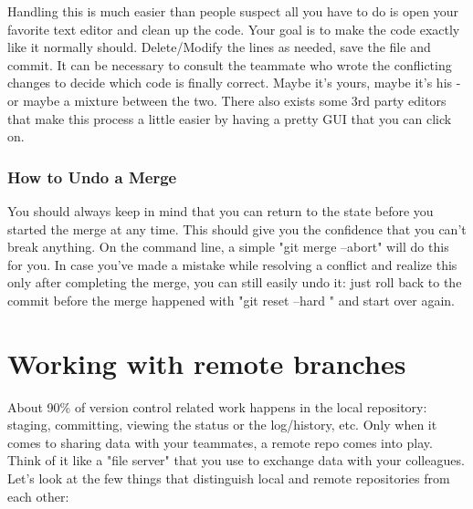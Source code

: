 \documentclass{article}
\begin{document}
Handling this is much easier than people suspect all you have to do is open your favorite text editor and clean up the code. Your goal is to make the code exactly like it normally should. Delete/Modify the lines as needed, save the file and commit. It can be necessary to consult the teammate who wrote the conflicting changes to decide which code is finally correct. Maybe it's yours, maybe it's his - or maybe a mixture between the two.
\newline\newline 
There also exists some 3rd party editors that make this process a little easier by having a pretty GUI that you can click on. 

\subsubsection{How to Undo a Merge}

You should always keep in mind that you can return to the state before you started the merge at any time. This should give you the confidence that you can't break anything. On the command line, a simple "git merge --abort" will do this for you.
\newline\newline
In case you've made a mistake while resolving a conflict and realize this only after completing the merge, you can still easily undo it: just roll back to the commit before the merge happened with "git reset --hard " and start over again.
\section{Working with remote branches}

About 90\% of version control related work happens in the local repository: staging, committing, viewing the status or the log/history, etc. 
\newline\newline
Only when it comes to sharing data with your teammates, a remote repo comes into play. Think of it like a "file server" that you use to exchange data with your colleagues.
\newline\newline
Let's look at the few things that distinguish local and remote repositories from each other:
\end{document}
